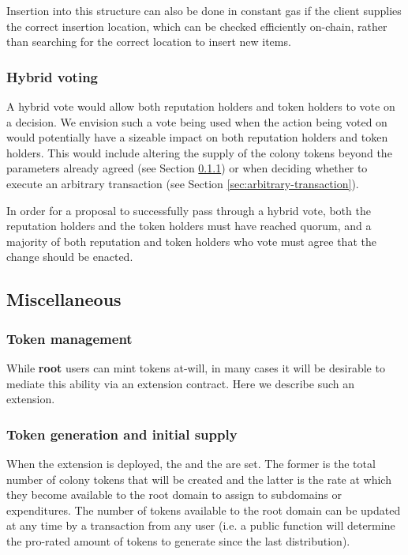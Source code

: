 Insertion into this structure can also be done in constant gas if the client supplies the correct insertion location, which can be checked efficiently on-chain, rather than searching for the correct location to insert new items.

\subsubsection*{Hybrid voting}

A hybrid vote would allow both reputation holders and token holders to vote on a decision. We envision such a vote being used when the action being voted on would potentially have a sizeable impact on both reputation holders and token holders. This would include altering the supply of the colony tokens beyond the parameters already agreed (see Section \ref{sec:colony-token-management}) or when deciding whether to execute an arbitrary transaction (see Section \ref{sec:arbitrary-transaction}).

In order for a proposal to successfully pass through a hybrid vote, both the reputation holders and the token holders must have reached quorum, and a majority of both reputation and token holders who vote must agree that the change should be enacted.

\subsection{Miscellaneous}\label{sec:extensions-misc}

\subsubsection{Token management}\label{sec:colony-token-management}

While \textbf{root} users can mint tokens at-will, in many cases it will be desirable to mediate this ability via an extension contract. Here we describe such an extension.

\subsubsection*{Token generation and initial supply}

When the extension is deployed, the  and the  are set. The former is the total number of colony tokens that will be created and the latter is the rate at which they become available to the root domain to assign to subdomains or expenditures. The number of tokens available to the root domain can be updated at any time by a transaction from any user (i.e. a public function will determine the pro-rated amount of tokens to generate since the last distribution).

